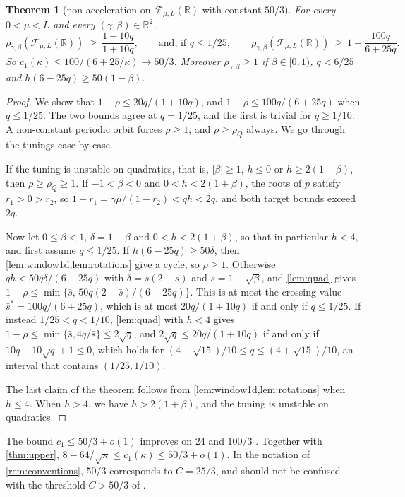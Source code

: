 \documentclass[11pt, a4paper]{article}
\newtheorem{theorem}{Theorem}
\theoremstyle{definition}
\newcommand{\R}{\mathbb{R}}
\newcommand{\F}{\mathcal{F}_{\mu,L}}
\begin{document}
\begin{theorem}[non-acceleration on $\F(\R)$ with constant $50/3$]
  \label{thm:onedim}
  For every $0<\mu<L$ and every $(\gamma,\beta)\in\R^2$,
  \[
    \rho_{\gamma,\beta}(\F(\R))\ \ge\ \frac{1-10q}{1+10q},
    \qquad\text{and, if }q\le1/25,\qquad
    \rho_{\gamma,\beta}(\F(\R))\ \ge\ 1-\frac{100q}{6+25q}.
  \]
  So $c_1(\kappa)\le100/(6+25/\kappa)\to50/3$. Moreover $\rho_{\gamma,\beta}\ge1$ if $\beta\in[0,1)$, $q<6/25$ and
  $h(6-25q)\ge50(1-\beta)$.
\end{theorem}

\begin{proof}
  We show that $1-\rho\le20q/(1+10q)$, and $1-\rho\le100q/(6+25q)$ when $q\le1/25$. The two bounds agree at $q=1/25$, and
  the first is trivial for $q\ge1/10$. A non-constant periodic orbit forces $\rho\ge1$, and $\rho\ge\rho_Q$ always. We go
  through the tunings case by case.

  If the tuning is unstable on quadratics, that is, $|\beta|\ge1$, $h\le0$ or $h\ge2(1+\beta)$, then
  $\rho\ge\rho_Q\ge1$. If $-1<\beta<0$ and $0<h<2(1+\beta)$, the roots of $p$ satisfy $r_1>0>r_2$, so
  $1-r_1=\gamma\mu/(1-r_2)<qh<2q$, and both target bounds exceed $2q$.

  Now let $0\le\beta<1$, $\delta=1-\beta$ and $0<h<2(1+\beta)$, so that in particular $h<4$, and first assume
  $q\le1/25$. If $h(6-25q)\ge50\delta$, then \cref{lem:window1d,lem:rotations} give a cycle, so $\rho\ge1$. Otherwise
  $qh<50q\delta/(6-25q)$ with $\delta=\bar s(2-\bar s)$ and $\bar s=1-\sqrt\beta$, and \cref{lem:quad} gives
  $1-\rho\le\min\{\bar s,\,50q(2-\bar s)/(6-25q)\}$. This is at most the crossing value
  $\bar s^\ast=100q/(6+25q)$, which is at most $20q/(1+10q)$ if and only if $q\le1/25$. If instead $1/25<q<1/10$,
  \cref{lem:quad} with $h<4$ gives $1-\rho\le\min\{\bar s,4q/\bar s\}\le2\sqrt q$, and $2\sqrt q\le20q/(1+10q)$ if and
  only if $10q-10\sqrt q+1\le0$, which holds for $(4-\sqrt{15})/10\le q\le(4+\sqrt{15})/10$, an interval that
  contains $(1/25,1/10)$.

  The last claim of the theorem follows from \cref{lem:window1d,lem:rotations} when $h\le4$. When $h>4$, we have
  $h>2(1+\beta)$, and the tuning is unstable on quadratics.
\end{proof}

The bound $c_1\le50/3+o(1)$ improves on $24$ \citep{liu2026sharp} and $100/3$
\citep{goujaud2025provable,fotopoulos2026cycling}. Together with \cref{thm:upper},
$8-64/\sqrt\kappa\le c_1(\kappa)\le50/3+o(1)$. In the notation of \cref{rem:conventions}, $50/3$ corresponds to
$C=25/3$, and should not be confused with the threshold $C>50/3$ of \citet{goujaud2025provable}.
\end{document}
